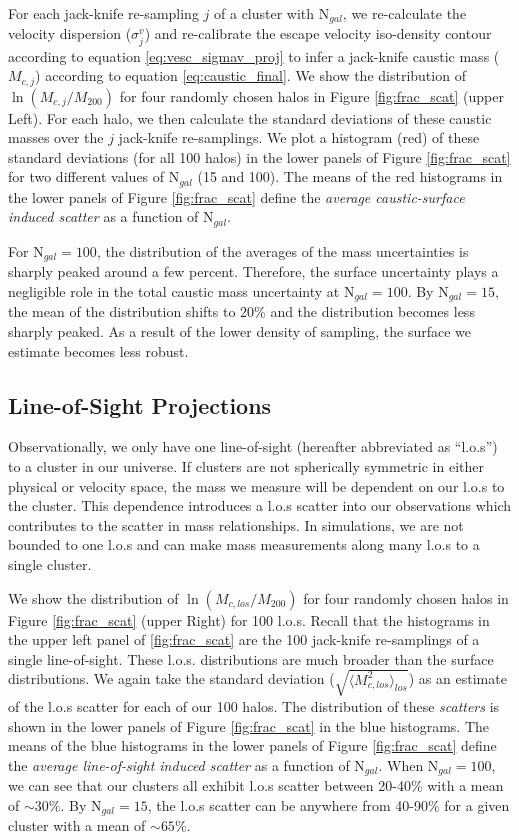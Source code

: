 \documentclass[iop]{emulateapj}
\begin{document}
For each jack-knife re-sampling $j$ of a cluster with N$_{gal}$, we re-calculate the velocity dispersion ($\sigma^v_j$) and re-calibrate the escape velocity iso-density contour according to equation \ref{eq:vesc_sigmav_proj} to infer a jack-knife caustic mass ($M_{c,j}$) according to equation \ref{eq:caustic_final}. We show the distribution of $\ln (M_{c,j}/M_{200})$ for four randomly chosen halos in Figure \ref{fig:frac_scat} (upper Left). For each halo, we then calculate the standard deviations of these caustic masses over the $j$ jack-knife re-samplings. We plot a histogram (red) of these standard deviations (for all 100 halos) in the lower panels of Figure \ref{fig:frac_scat} for two different values of N$_{gal}$ (15 and 100). The means of the red histograms in the lower panels of Figure \ref{fig:frac_scat} define the {\it average caustic-surface induced scatter} as a function of  N$_{gal}$.

For  N$_{gal} = 100$, the distribution of the averages of the mass uncertainties is sharply peaked around a few percent. Therefore, the surface uncertainty plays a negligible role in the total caustic mass uncertainty at N$_{gal} = 100$. By N$_{gal} = 15$, the mean of the distribution shifts to 20\% and the distribution becomes less sharply peaked. As a result of the lower density of sampling, the surface we estimate becomes less robust.

\subsection{Line-of-Sight Projections}
\label{sec:results_los}
Observationally, we only have one line-of-sight (hereafter abbreviated as ``l.o.s'') to a cluster in our universe. If clusters are not spherically symmetric in either physical or velocity space, the mass we measure will be dependent on our l.o.s to the cluster. This dependence introduces a l.o.s scatter into our observations which contributes to the scatter in mass relationships. In simulations, we are not bounded to one l.o.s and can make mass measurements along many l.o.s to a single cluster.

We show the distribution of $\ln (M_{c,los}/M_{200})$ for four randomly chosen halos in Figure \ref{fig:frac_scat} (upper Right) for 100 l.o.s. Recall that the histograms in the upper left panel of \ref{fig:frac_scat} are the 100 jack-knife re-samplings of a single line-of-sight. These l.o.s. distributions are much broader than the surface distributions. We again take the standard deviation ($\sqrt{\langle M_{c,los}^2 \rangle_{los}}$) as an estimate of the l.o.s scatter for each of our 100 halos.  The distribution of these \emph{scatters} is shown in the lower panels of Figure \ref{fig:frac_scat} in the blue histograms.  The means of the blue histograms in the lower panels of Figure \ref{fig:frac_scat} define the {\it average line-of-sight induced scatter} as a function of  N$_{gal}$. When N$_{gal} = 100$, we can see that our clusters all exhibit l.o.s scatter between 20-40\% with a mean of $\sim 30\%$. By N$_{gal} = 15$, the l.o.s scatter can be anywhere from 40-90\% for a given cluster with a mean of $\sim 65\%$.
\end{document}
